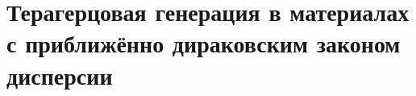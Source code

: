 \chapter{Терагерцовая генерация в материалах с приближённо дираковским законом дисперсии} \label{chapter:HgCdTe}


